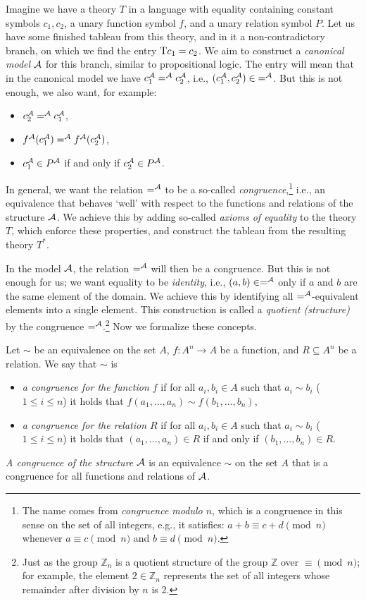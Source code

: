 Imagine we have a theory $T$ in a language with equality containing constant symbols $c_1,c_2$, a unary function symbol $f$, and a unary relation symbol $P$. Let us have some finished tableau from this theory, and in it a non-contradictory branch, on which we find the entry $\mathrm{T} c_1=c_2$. We aim to construct a \emph{canonical model} $\mathcal{A}$ for this branch, similar to propositional logic. The entry will mean that in the canonical model we have $c_1^{\mathcal{A}} =^{\mathcal{A}} c_2^{\mathcal{A}}$, i.e., $(c_1^{\mathcal{A}},c_2^{\mathcal{A}})\in {=^{\mathcal{A}}}$. But this is not enough, we also want, for example:
\begin{itemize}
    \item $c_2^{\mathcal{A}} =^{\mathcal{A}} c_1^{\mathcal{A}}$,
    \item $f^{\mathcal{A}}(c_1^{\mathcal{A}}) =^{\mathcal{A}} f^{\mathcal{A}}(c_2^{\mathcal{A}})$,
    \item $c_1^{\mathcal{A}} \in P^{\mathcal{A}}$ if and only if $c_2^{\mathcal{A}} \in P^{\mathcal{A}}$.
\end{itemize}
In general, we want the relation $=^{\mathcal{A}}$ to be a so-called \emph{congruence},\footnote{The name comes from \emph{congruence modulo $n$}, which is a congruence in this sense on the set of all integers, e.g., it satisfies: $a+b\equiv c+d\pmod n$ whenever $a\equiv c\pmod n$ and $b\equiv d\pmod n$.} i.e., an equivalence that behaves `well' with respect to the functions and relations of the structure $\mathcal{A}$. We achieve this by adding so-called \emph{axioms of equality} to the theory $T$, which enforce these properties, and construct the tableau from the resulting theory $T^*$.

In the model $\mathcal{A}$, the relation $=^{\mathcal{A}}$ will then be a congruence. But this is not enough for us; we want equality to be \emph{identity}, i.e., $(a,b)\in=^{\mathcal{A}}$ only if $a$ and $b$ are the same element of the domain. We achieve this by identifying all $=^{\mathcal{A}}$-equivalent elements into a single element. This construction is called a \emph{quotient (structure)} by the congruence $=^{\mathcal{A}}$.\footnote{Just as the group $\mathbb Z_n$ is a quotient structure of the group $\mathbb Z$ over $\equiv\pmod n$; for example, the element $2\in\mathbb Z_n$ represents the set of all integers whose remainder after division by $n$ is 2.} Now we formalize these concepts.

\begin{definition}[Congruence]
    Let $\sim$ be an equivalence on the set $A$, $f\colon A^n\to A$ be a function, and $R\subseteq A^n$ be a relation. We say that $\sim$ is
    \begin{itemize}
        \item \emph{a congruence for the function $f$} if for all $a_i,b_i\in A$ such that $a_i\sim b_i$ ($1\leq i\leq n$) it holds that $f(a_1,\dots,a_n)\sim f(b_1,\dots,b_n)$,
        \item \emph{a congruence for the relation $R$} if for all $a_i,b_i\in A$ such that $a_i\sim b_i$ ($1\leq i\leq n$) it holds that $(a_1,\dots,a_n)\in R$ if and only if $(b_1,\dots,b_n)\in R$.
    \end{itemize}    
    \emph{A congruence of the structure} $\mathcal{A}$ is an equivalence $\sim$ on the set $A$ that is a congruence for all functions and relations of $\mathcal{A}$. 
\end{definition}

